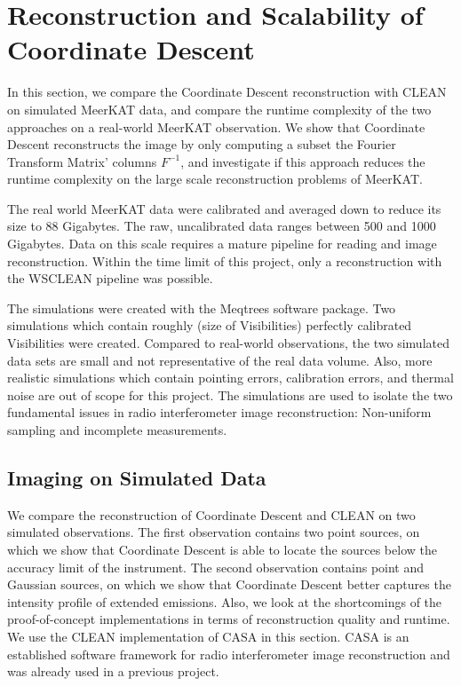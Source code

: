 \section{Reconstruction and Scalability of Coordinate Descent}
In this section, we compare the Coordinate Descent reconstruction with CLEAN on simulated MeerKAT data, and compare the runtime complexity of the two approaches on a real-world MeerKAT observation. We show that Coordinate Descent reconstructs the image by only computing a subset  the Fourier Transform Matrix' columns $F^{-1}$, and investigate if this approach reduces the runtime complexity on the large scale reconstruction problems of MeerKAT.

The real world MeerKAT data were calibrated and averaged down to reduce its size to 88 Gigabytes. The raw, uncalibrated data ranges between 500 and 1000 Gigabytes. Data on this scale requires a mature pipeline for reading and image reconstruction. Within the time limit of this project, only a reconstruction with the WSCLEAN\cite{offringa2014wsclean} pipeline was possible.

The simulations were created with the Meqtrees software package. Two simulations which contain roughly (size of Visibilities) perfectly calibrated Visibilities were created. Compared to real-world observations, the two simulated data sets are small and not representative of the real data volume. Also, more realistic simulations which contain pointing errors, calibration errors, and thermal noise are out of scope for this project. The simulations are used to isolate the two fundamental issues in radio interferometer image reconstruction: Non-uniform sampling and incomplete measurements.

\subsection{Imaging on Simulated Data}
We compare the reconstruction of Coordinate Descent and CLEAN on two simulated observations. The first observation contains two point sources, on which we show that Coordinate Descent is able to locate the sources below the accuracy limit of the instrument. The second observation contains point and Gaussian sources, on which we show that Coordinate Descent better captures the intensity profile of extended emissions. Also, we look at the shortcomings of the proof-of-concept implementations in terms of reconstruction quality and runtime. We use the CLEAN implementation of CASA in this section. CASA is an established software framework for radio interferometer image reconstruction and was already used in a previous project.

